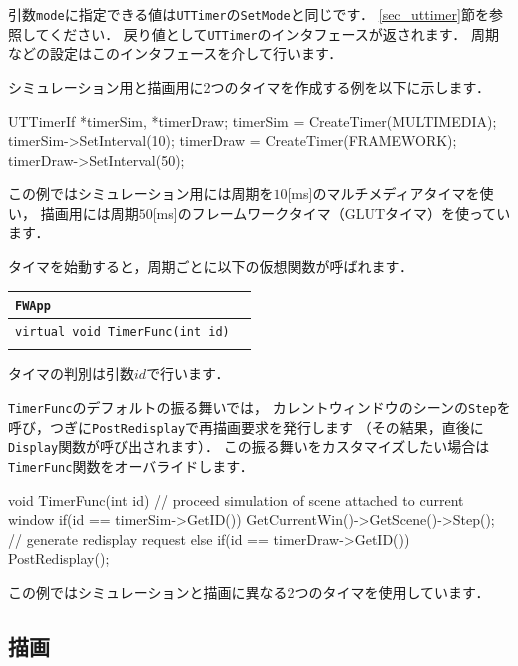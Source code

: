 \KLUDGE 引数\texttt{mode}\KLUDGE に指定できる値は\texttt{UTTimer}\KLUDGE の\texttt{SetMode}\KLUDGE と同じです．
\ref{sec_uttimer}\KLUDGE 節を参照してください．
\KLUDGE 戻り値として\texttt{UTTimer}\KLUDGE のインタフェースが返されます．
\KLUDGE 周期などの設定はこのインタフェースを介して行います．

\KLUDGE シミュレーション用と描画用に2\KLUDGE つのタイマを作成する例を以下に示します．
\begin{sourcecode}
UTTimerIf *timerSim, *timerDraw;
timerSim = CreateTimer(MULTIMEDIA);
timerSim->SetInterval(10);
timerDraw = CreateTimer(FRAMEWORK);
timerDraw->SetInterval(50);
\end{sourcecode}
\KLUDGE この例ではシミュレーション用には周期を$10$[ms]\KLUDGE のマルチメディアタイマを使い，
\KLUDGE 描画用には周期$50$[ms]\KLUDGE のフレームワークタイマ（GLUT\KLUDGE タイマ）を使っています．

\KLUDGE タイマを始動すると，周期ごとに以下の仮想関数が呼ばれます．

\noindent
\begin{tabular}{p{.7\hsize}p{.2\hsize}}
\\
\texttt{FWApp}								\\ \midrule
\texttt{virtual void TimerFunc(int id)}	&	\\
\\
\end{tabular}
\KLUDGE タイマの判別は引数$id$\KLUDGE で行います．

\texttt{TimerFunc}\KLUDGE のデフォルトの振る舞いでは，
\KLUDGE カレントウィンドウのシーンの\texttt{Step}\KLUDGE を呼び，つぎに\texttt{PostRedisplay}\KLUDGE で再描画要求を発行します
\KLUDGE （その結果，直後に\texttt{Display}\KLUDGE 関数が呼び出されます）．
\KLUDGE この振る舞いをカスタマイズしたい場合は\texttt{TimerFunc}\KLUDGE 関数をオーバライドします．
\begin{sourcecode}
void TimerFunc(int id){
    // proceed simulation of scene attached to current window
    if(id == timerSim->GetID()){
        GetCurrentWin()->GetScene()->Step();
    }
    // generate redisplay request
    else if(id == timerDraw->GetID()){
        PostRedisplay();
    }
}
\end{sourcecode}
\KLUDGE この例ではシミュレーションと描画に異なる2\KLUDGE つのタイマを使用しています．

\subsection*{\KLUDGE 描画}


